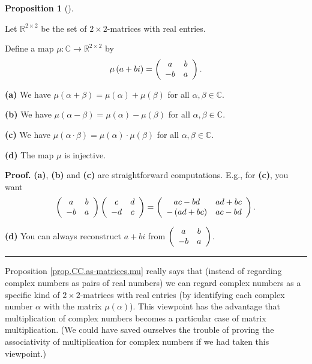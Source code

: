\documentclass[numbers=enddot,12pt,final,onecolumn,notitlepage]{scrartcl}%
\numberwithin{exer}{subsection}
\theoremstyle{definition}
\newtheorem{prop}[theo]{Proposition}
\newenvironment{proposition}[1][]
{\begin{prop}[#1]\begin{leftbar}}
{\end{leftbar}\end{prop}}
\newenvironment{proof}[1][Proof]{\noindent\textbf{#1.} }{\ \rule{0.5em}{0.5em}}
\begin{document}
\begin{proposition}
\label{prop.CC.as-matrices.mu}Let $\mathbb{R}^{2\times2}$ be the set of
$2\times2$-matrices with real entries.

Define a map $\mu:\mathbb{C}\rightarrow\mathbb{R}^{2\times2}$ by%
\[
\mu\left(  a+bi\right)  =\left(
\begin{array}
[c]{cc}%
a & b\\
-b & a
\end{array}
\right)  .
\]


\textbf{(a)} We have $\mu\left(  \alpha+\beta\right)  =\mu\left(
\alpha\right)  +\mu\left(  \beta\right)  $ for all $\alpha,\beta\in\mathbb{C}$.

\textbf{(b)} We have $\mu\left(  \alpha-\beta\right)  =\mu\left(
\alpha\right)  -\mu\left(  \beta\right)  $ for all $\alpha,\beta\in\mathbb{C}$.

\textbf{(c)} We have $\mu\left(  \alpha\cdot\beta\right)  =\mu\left(
\alpha\right)  \cdot\mu\left(  \beta\right)  $ for all $\alpha,\beta
\in\mathbb{C}$.

\textbf{(d)} The map $\mu$ is injective.
\end{proposition}

\begin{proof}
\textbf{(a)}, \textbf{(b)} and \textbf{(c)} are straightforward computations.
E.g., for \textbf{(c)}, you want%
\[
\left(
\begin{array}
[c]{cc}%
a & b\\
-b & a
\end{array}
\right)  \left(
\begin{array}
[c]{cc}%
c & d\\
-d & c
\end{array}
\right)  =\left(
\begin{array}
[c]{cc}%
ac-bd & ad+bc\\
-\left(  ad+bc\right)  & ac-bd
\end{array}
\right)  .
\]


\textbf{(d)} You can always reconstruct $a+bi$ from $\left(
\begin{array}
[c]{cc}%
a & b\\
-b & a
\end{array}
\right)  $.
\end{proof}

Proposition \ref{prop.CC.as-matrices.mu} really says that (instead of
regarding complex numbers as pairs of real numbers) we can regard complex
numbers as a specific kind of $2\times2$-matrices with real entries (by
identifying each complex number $\alpha$ with the matrix $\mu\left(
\alpha\right)  $). This viewpoint has the advantage that multiplication of
complex numbers becomes a particular case of matrix multiplication. (We could
have saved ourselves the trouble of proving the associativity of
multiplication for complex numbers if we had taken this viewpoint.)
\end{document}
